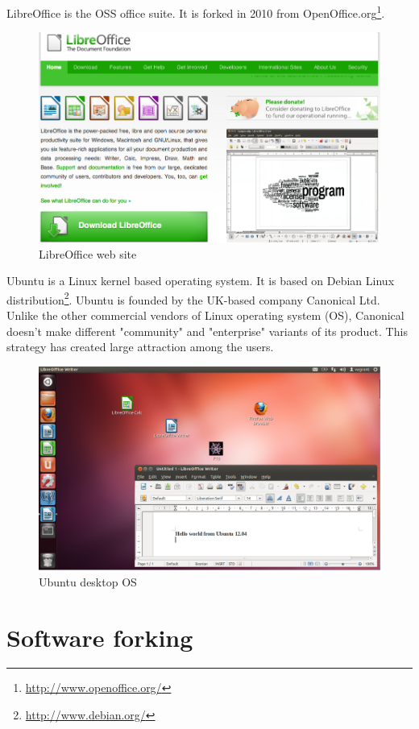 \documentclass[times, utf8, seminar]{fit}
\begin{document}
LibreOffice is the OSS office suite. It is forked in 2010 from OpenOffice.org\footnote{\url{http://www.openoffice.org/}}.

\begin{figure}[H]
\centering
\includegraphics[width=12cm]{img/libre_web.png}
\caption{LibreOffice web site}
\end{figure}

Ubuntu is a Linux kernel based operating system. It is based on Debian Linux distribution\footnote{\url{http://www.debian.org/}}. Ubuntu is founded by the UK-based company Canonical Ltd. Unlike the other commercial vendors of Linux operating system (OS), Canonical doesn't make different "community" and "enterprise" variants of its product. This strategy has created large attraction among the users.   

\begin{figure}[H]
\centering
\includegraphics[width=12cm]{img/ubuntu_desktop.png}
\caption{Ubuntu desktop OS}
\end{figure}


\section{Software forking}
\end{document}

